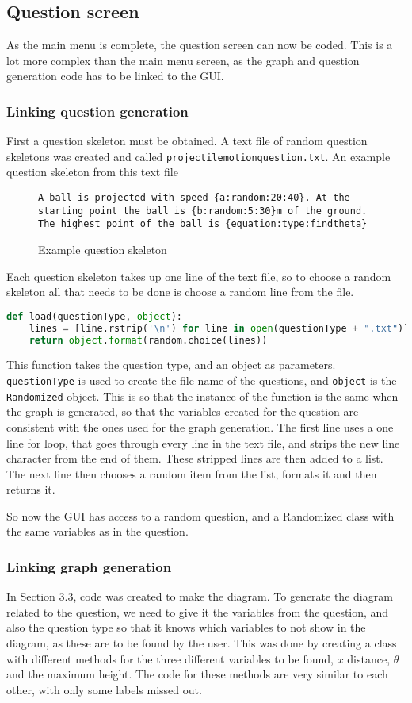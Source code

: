 \subsection{Question screen}
As the main menu is complete, the question screen can now be coded. This is a lot more complex than the main menu screen, as the graph and question generation code has to be linked to the GUI.
\subsubsection{Linking question generation}
First a question skeleton must be obtained. A text file of random question skeletons was created and called \texttt{projectilemotionquestion.txt}. An example question skeleton from this text file
\begin{figure}[H]
	\texttt{A ball is projected with speed \{a:random:20:40\}. At the starting point the ball is \{b:random:5:30\}m of the ground. The highest point of the ball is \{equation:type:findtheta\}}
	\caption{Example question skeleton}
\end{figure} 
Each question skeleton takes up one line of the text file, so to choose a random skeleton all that needs to be done is choose a random line from the file.
\begin{lstlisting}[language=Python, caption=Function to return random formatted question]
def load(questionType, object):
	lines = [line.rstrip('\n') for line in open(questionType + ".txt")]
	return object.format(random.choice(lines))
\end{lstlisting}
This function takes the question type, and an object as parameters. \texttt{questionType} is used to create the file name of the questions, and \texttt{object} is the \texttt{Randomized} object. This is so that the instance of the function is the same when the graph is generated, so that the variables created for the question are consistent with the ones used for the graph generation. The first line uses a one line for loop, that goes through every line in the text file, and strips the new line character from the end of them. These stripped lines are then added to a list. The next line then chooses a random item from the list, formats it and then returns it. 

So now the GUI has access to a random question, and a Randomized class with the same variables as in the question.
\subsubsection{Linking graph generation}
In Section 3.3, code was created to make the diagram. To generate the diagram related to the question, we need to give it the variables from the question, and also the question type so that it knows which variables to not show in the diagram, as these are to be found by the user. This was done by creating a class with different methods for the three different variables to be found, $x$ distance, $\theta$ and the maximum height. The code for these methods are very similar to each other, with only some labels missed out. 

